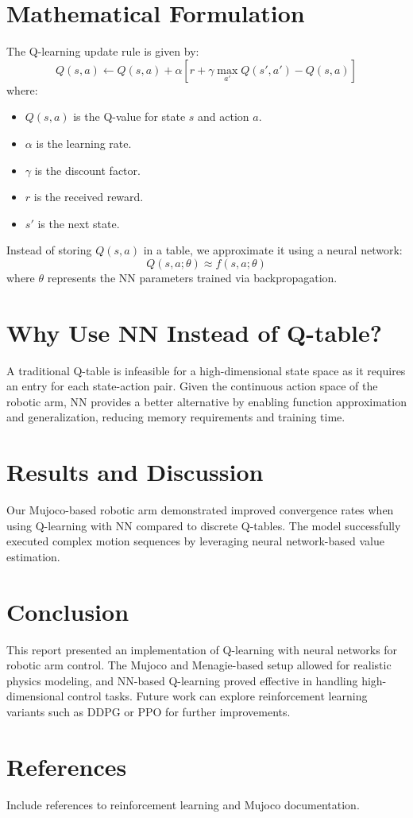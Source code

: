 \documentclass{article}
\begin{document}
\section{Mathematical Formulation}
The Q-learning update rule is given by:
\begin{equation}
    Q(s, a) \leftarrow Q(s, a) + \alpha \left[ r + \gamma \max_{a'} Q(s', a') - Q(s, a) \right]
\end{equation}
where:
\begin{itemize}
    \item $Q(s, a)$ is the Q-value for state $s$ and action $a$.
    \item $\alpha$ is the learning rate.
    \item $\gamma$ is the discount factor.
    \item $r$ is the received reward.
    \item $s'$ is the next state.
\end{itemize}
Instead of storing $Q(s,a)$ in a table, we approximate it using a neural network:
\begin{equation}
    Q(s, a; \theta) \approx f(s, a; \theta)
\end{equation}
where $\theta$ represents the NN parameters trained via backpropagation.

\section{Why Use NN Instead of Q-table?}
A traditional Q-table is infeasible for a high-dimensional state space as it requires an entry for each state-action pair. Given the continuous action space of the robotic arm, NN provides a better alternative by enabling function approximation and generalization, reducing memory requirements and training time.

\section{Results and Discussion}
Our Mujoco-based robotic arm demonstrated improved convergence rates when using Q-learning with NN compared to discrete Q-tables. The model successfully executed complex motion sequences by leveraging neural network-based value estimation.

\section{Conclusion}
This report presented an implementation of Q-learning with neural networks for robotic arm control. The Mujoco and Menagie-based setup allowed for realistic physics modeling, and NN-based Q-learning proved effective in handling high-dimensional control tasks. Future work can explore reinforcement learning variants such as DDPG or PPO for further improvements.

\section{References}
Include references to reinforcement learning and Mujoco documentation.
\end{document}
